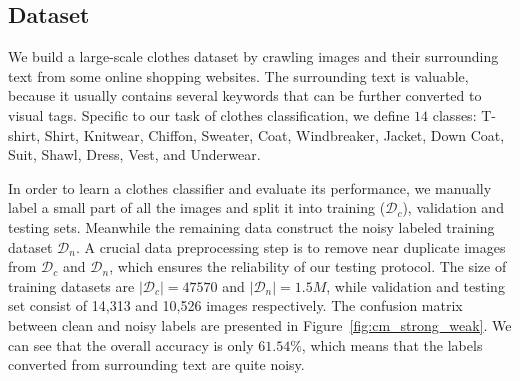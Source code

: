 \documentclass[10pt,twocolumn,letterpaper]{article}
\begin{document}
\subsection{Dataset} %
\label{sub:dataset}
We build a large-scale clothes dataset by crawling images and their surrounding text from some online shopping websites. The surrounding text is valuable, because it usually contains several keywords that can be further converted to visual tags. Specific to our task of clothes classification, we define $14$ classes: T-shirt, Shirt, Knitwear, Chiffon, Sweater, Coat, Windbreaker, Jacket, Down Coat, Suit, Shawl, Dress, Vest, and Underwear.

In order to learn a clothes classifier and evaluate its performance, we manually label a small part of all the images and split it into training ($\mathcal{D}_c$), validation and testing sets. Meanwhile the remaining data construct the noisy labeled training dataset $\mathcal{D}_n$. A crucial data preprocessing step is to remove near duplicate images from $\mathcal{D}_c$ and $\mathcal{D}_n$, which ensures the reliability of our testing protocol. The size of training datasets are $|\mathcal{D}_c| = 47570$ and $|\mathcal{D}_n| = 1.5M$, while validation and testing set consist of 14,313 and 10,526 images respectively. The confusion matrix between clean and noisy labels are presented in Figure~\ref{fig:cm_strong_weak}. We can see that the overall accuracy is only $61.54\%$, which means that the labels converted from surrounding text are quite noisy.
\end{document}
